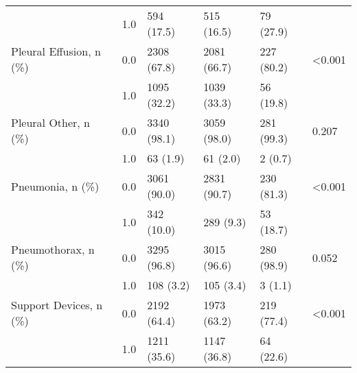 \begin{tabular}{llllll}
                       & 1.0 &            594 (17.5) &   515 (16.5) &   79 (27.9) &         \\
Pleural Effusion, n (\%) & 0.0 &           2308 (67.8) &  2081 (66.7) &  227 (80.2) &  <0.001 \\
                       & 1.0 &           1095 (32.2) &  1039 (33.3) &   56 (19.8) &         \\
Pleural Other, n (\%) & 0.0 &           3340 (98.1) &  3059 (98.0) &  281 (99.3) &   0.207 \\
                       & 1.0 &              63 (1.9) &     61 (2.0) &     2 (0.7) &         \\
Pneumonia, n (\%) & 0.0 &           3061 (90.0) &  2831 (90.7) &  230 (81.3) &  <0.001 \\
                       & 1.0 &            342 (10.0) &    289 (9.3) &   53 (18.7) &         \\
Pneumothorax, n (\%) & 0.0 &           3295 (96.8) &  3015 (96.6) &  280 (98.9) &   0.052 \\
                       & 1.0 &             108 (3.2) &    105 (3.4) &     3 (1.1) &         \\
Support Devices, n (\%) & 0.0 &           2192 (64.4) &  1973 (63.2) &  219 (77.4) &  <0.001 \\
                       & 1.0 &           1211 (35.6) &  1147 (36.8) &   64 (22.6) &         \\
\bottomrule
\end{tabular}
